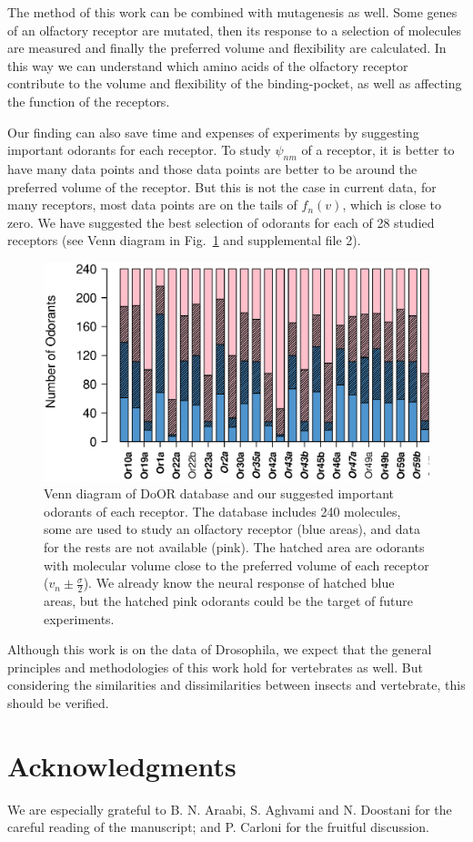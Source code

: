 \documentclass[11pt]{article} %
\newcommand{\numberofreceptors}{ 28 }
\begin{document}
The method of this work can be combined with mutagenesis as well. 
Some genes of an olfactory receptor are mutated, 
then its response to a selection of molecules are measured and finally the preferred volume and flexibility are calculated.
In this way we can understand which amino acids of the olfactory receptor contribute to the volume and flexibility of the binding-pocket, 
as well as affecting the function of the receptors.

Our finding can also save time and expenses of experiments by suggesting important odorants for each receptor.
To study $\psi_{nm}$ of a receptor, 
it is better to have many data points and those data points are better to be around the preferred volume of the receptor.
But this is not the case in current data, 
for many receptors, 
most data points are on the tails of $f_n(v)$, which is close to zero.
We have suggested the best selection of odorants for each of \numberofreceptors studied receptors 
(see Venn diagram in Fig.~\ref{fig:odorant-suggest} and supplemental file 2).

\begin{figure}
\centering
	\includegraphics[width=\textwidth]{fig/odorant-suggest}
	\caption{Venn diagram of DoOR database and our suggested important odorants of each receptor.
			The database includes 240 molecules, 
			some are used to study an olfactory receptor (blue areas), 
			and data for the rests are not available (pink).
			The hatched area are odorants with molecular volume close to the preferred volume of each receptor
			($v_n \pm \frac{\sigma}{2}$).
			We already know the neural response of hatched blue areas, 
			but the hatched pink odorants could be the target of future experiments.
			}
	\label{fig:odorant-suggest}
\end{figure}

Although this work is on the data of Drosophila, 
we expect that the general principles and methodologies of this work hold for vertebrates as well. 
But considering the similarities and dissimilarities between insects and vertebrate, 
this should be verified.

\section*{Acknowledgments}
We are especially grateful to B. N. Araabi, S. Aghvami and N. Doostani for the careful reading of the manuscript; and P. Carloni for the fruitful discussion.





\end{document}
